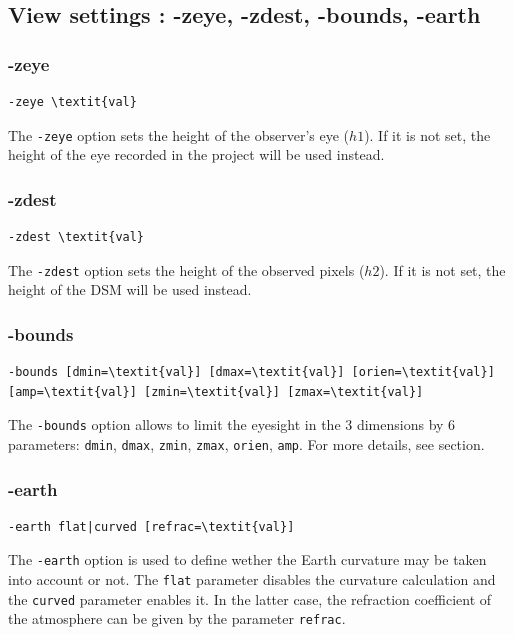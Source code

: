 \documentclass{report}
\begin{document}
\subsection{View settings : -zeye, -zdest, -bounds, -earth}

\subsubsection{-zeye}
\begin{Verbatim}[commandchars=\\\{\}]
-zeye \textit{val}
\end{Verbatim}
The \verb|-zeye| option sets the height of the observer's eye ($h1$). If it is not set, the height of the eye recorded in the project will be used instead.

\subsubsection{-zdest}
\begin{Verbatim}[commandchars=\\\{\}]
-zdest \textit{val}
\end{Verbatim}
The \verb|-zdest| option sets the height of the observed pixels ($h2$). If it is not set, the height of the DSM will be used instead.

\subsubsection{-bounds}
\begin{Verbatim}[commandchars=\\\{\}]
-bounds [dmin=\textit{val}] [dmax=\textit{val}] [orien=\textit{val}] [amp=\textit{val}] [zmin=\textit{val}] [zmax=\textit{val}]
\end{Verbatim}
The \verb|-bounds| option allows to limit the eyesight in the 3 dimensions by 6 parameters: \verb|dmin|, \verb|dmax|, \verb|zmin|, \verb|zmax|, \verb|orien|, \verb|amp|. For more details, see  section.

\subsubsection{-earth}
\begin{Verbatim}[commandchars=\\\{\}]
-earth flat|curved [refrac=\textit{val}]
\end{Verbatim}

The \verb|-earth| option is used to define wether the Earth curvature may be taken into account or not. The \verb|flat| parameter disables the curvature calculation and the \verb|curved| parameter enables it. In the latter case, the refraction coefficient of the atmosphere can be given by the parameter \verb|refrac|.
\end{document}
